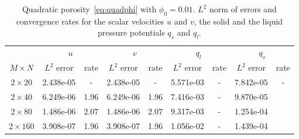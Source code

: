 					 \begin{table}
					\begin{tabular}{c || c | c || c | c || c | c || c | c }
							  \quad & \multicolumn{2}{c||}{$u$} & \multicolumn{2}{c||}{$v$}& \multicolumn{2}{c||}{$q_l$} & \multicolumn{2}{c}{$q_s$} \\
							  $M\times N$ & $L^2$ error & rate & $L^2$ error & rate & $L^2$ error & rate & $L^2$ error & rate \\
							  \hline
							  $2\times20$ &  2.438e-05 & -& 2.438e-05 & - & 5.571e-03 & - & 7.842e-05 & -\\
							  $2\times40$ &  6.249e-06 & 1.96 & 6.249e-06 & 1.96 & 7.416e-03 & - & 9.870e-05 & \\
							  $2\times80$ &  1.486e-06 & 2.07 & 1.486e-06 & 2.07 & 9.317e-03 & - & 1.254e-04 & \\
							  $2\times160$ & 3.908e-07 & 1.96 & 3.908e-07 & 1.96 & 1.056e-02 & - & 1.439e-04 & 
					\end{tabular}
									\caption{Quadratic porosity~\eqref{eq:quadphi}  with $\phi_0 = 0.01$. $L^2$ norm of errors and 
								convergence rates
								for the scalar velocities $u$ and $v$, the solid and 
								the liquid pressure potentials $q_s$ and $q_l$.}		
	
								\label{tab:quadporositycolumn_0.01}
					 \end{table}


